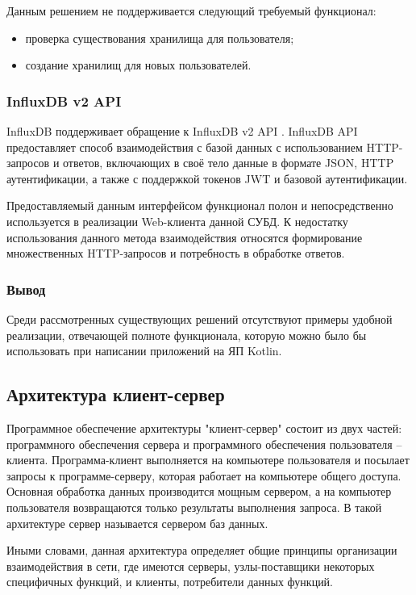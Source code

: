 Данным решением не поддерживается следующий требуемый функционал:
\begin{itemize}[leftmargin=1.6\parindent]
\item проверка существования хранилища для пользователя;
\item создание хранилищ для новых пользователей.
\end{itemize}

\subsubsection{InfluxDB v2 API}
InfluxDB поддерживает обращение к InfluxDB v2 API \cite{influxApi}. InfluxDB API предоставляет способ взаимодействия с базой данных с использованием HTTP-запросов и ответов, включающих в своё тело данные в формате JSON, HTTP аутентификации, а также с поддержкой токенов JWT и базовой аутентификации.

Предоставляемый данным интерфейсом функционал полон и непосредственно используется в реализации Web-клиента данной СУБД. К недостатку использования данного метода взаимодействия относятся формирование множественных HTTP-запросов и потребность в обработке ответов.

\subsubsection*{Вывод}
Среди рассмотренных существующих решений отсутствуют примеры удобной реализации, отвечающей полноте функционала, которую можно было бы использовать при написании приложений на ЯП Kotlin.

\subsection{Архитектура клиент-сервер}
Программное обеспечение архитектуры "клиент-сервер" состоит из двух частей: программного обеспечения сервера и программного обеспечения пользователя -- клиента. Программа-клиент выполняется на компьютере пользователя и посылает запросы к программе-серверу, которая работает на компьютере общего доступа. Основная обработка данных производится мощным сервером, а на компьютер пользователя возвращаются только результаты выполнения запроса. В такой архитектуре сервер называется сервером баз данных. \cite{clientServer}

Иными словами, данная архитектура определяет общие принципы организации взаимодействия в сети, где имеются серверы, узлы-поставщики некоторых специфичных функций, и клиенты, потребители данных функций.

